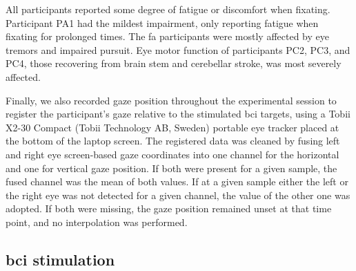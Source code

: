 \documentclass{article}
\begin{document}
All participants reported some degree of fatigue or discomfort when fixating.
Participant PA1 had the mildest impairment, only reporting fatigue when fixating
for prolonged times.
The \ac{fa} participants were mostly affected by eye tremors and impaired pursuit.
Eye motor function of participants PC2, PC3, and PC4, those recovering from
brain stem and cerebellar stroke, was most severely affected.



Finally, we also recorded gaze position throughout the experimental session to
register the participant's gaze relative to the stimulated \ac{bci} targets,
using a Tobii X2-30 Compact (Tobii Technology AB, Sweden) portable eye tracker placed at the bottom of the laptop screen.
The registered data was cleaned by fusing left and right eye screen-based gaze
coordinates into one channel for the horizontal and one for vertical gaze position.
If both were present for a given sample, the fused channel was the mean of both
values.
If at a given sample either the left or the right eye was not detected for a
given channel, the value of the other one was adopted.
If both were missing, the gaze position remained unset at that time point, and no
interpolation was performed.



\subsection{\Acs{bci} stimulation}
\end{document}
